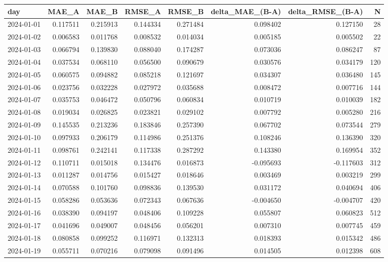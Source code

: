 \begin{tabular}{lrrrrrrr}
\toprule
day & MAE_A & MAE_B & RMSE_A & RMSE_B & delta_MAE_(B-A) & delta_RMSE_(B-A) & N \\
\midrule
2024-01-01 & 0.117511 & 0.215913 & 0.144334 & 0.271484 & 0.098402 & 0.127150 & 28 \\
2024-01-02 & 0.006583 & 0.011768 & 0.008532 & 0.014034 & 0.005185 & 0.005502 & 22 \\
2024-01-03 & 0.066794 & 0.139830 & 0.088040 & 0.174287 & 0.073036 & 0.086247 & 87 \\
2024-01-04 & 0.037534 & 0.068110 & 0.056500 & 0.090679 & 0.030576 & 0.034179 & 120 \\
2024-01-05 & 0.060575 & 0.094882 & 0.085218 & 0.121697 & 0.034307 & 0.036480 & 145 \\
2024-01-06 & 0.023756 & 0.032228 & 0.027972 & 0.035688 & 0.008472 & 0.007716 & 144 \\
2024-01-07 & 0.035753 & 0.046472 & 0.050796 & 0.060834 & 0.010719 & 0.010039 & 182 \\
2024-01-08 & 0.019034 & 0.026825 & 0.023821 & 0.029102 & 0.007792 & 0.005280 & 216 \\
2024-01-09 & 0.145535 & 0.213236 & 0.183846 & 0.257390 & 0.067702 & 0.073544 & 279 \\
2024-01-10 & 0.097933 & 0.206179 & 0.114986 & 0.251376 & 0.108246 & 0.136390 & 320 \\
2024-01-11 & 0.098761 & 0.242141 & 0.117338 & 0.287292 & 0.143380 & 0.169954 & 352 \\
2024-01-12 & 0.110711 & 0.015018 & 0.134476 & 0.016873 & -0.095693 & -0.117603 & 312 \\
2024-01-13 & 0.011287 & 0.014756 & 0.015427 & 0.018646 & 0.003469 & 0.003219 & 299 \\
2024-01-14 & 0.070588 & 0.101760 & 0.098836 & 0.139530 & 0.031172 & 0.040694 & 406 \\
2024-01-15 & 0.058286 & 0.053636 & 0.072343 & 0.067636 & -0.004650 & -0.004707 & 420 \\
2024-01-16 & 0.038390 & 0.094197 & 0.048406 & 0.109228 & 0.055807 & 0.060823 & 512 \\
2024-01-17 & 0.041696 & 0.049007 & 0.048456 & 0.056201 & 0.007310 & 0.007745 & 459 \\
2024-01-18 & 0.080858 & 0.099252 & 0.116971 & 0.132313 & 0.018393 & 0.015342 & 486 \\
2024-01-19 & 0.055711 & 0.070216 & 0.079098 & 0.091496 & 0.014505 & 0.012398 & 608 \\

\end{tabular}
